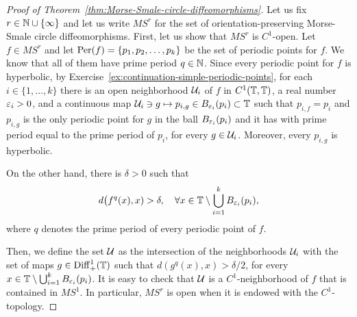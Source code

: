 \begin{proof}[Proof of Theorem~\ref{thm:Morse-Smale-circle-diffeomorphisms}]
  Let us fix $r\in\mathbb{N}\cup\{\infty\}$ and let us write $MS^r$ for the set of orientation-preserving Morse-Smale circle diffeomorphisms. First, let us show that $MS^r$ is $C^1$-open. Let $f\in MS^r$ and let $\operatorname{Per}(f)=\{p_1,p_2,\ldots,p_k\}$ be the set of periodic points for $f$. We know that all of them have prime period $q\in\mathbb{N}$. Since every periodic point for $f$ is hyperbolic, by Exercise~\ref{ex:continuation-simple-periodic-points}, for each $i\in\{1,\ldots,k\}$ there is an open neighborhood $\mathcal{U}_i$ of $f$ in $C^1(\mathbb{T},\mathbb{T})$, a real number $\varepsilon_i>0$, and a continuous map $\mathcal{U}_i\ni g\mapsto p_{i,g}\in B_{\varepsilon_i}(p_i)\subset\mathbb{T}$ such that $p_{i,f}=p_i$ and $p_{i,g}$ is the only periodic point for $g$ in the ball $B_{\varepsilon_i}(p_i)$ and it has with prime period equal to the prime period of $p_i$, for every $g\in\mathcal{U}_i$. Moreover, every $p_{i,g}$ is hyperbolic.

  On the other hand, there is $\delta>0$ such that
  \begin{displaymath}
    d\big(f^q(x),x)>\delta, \quad\forall x\in\mathbb{T}\setminus\bigcup_{i=1}^k B_{\varepsilon_i}(p_i),
  \end{displaymath}
  where $q$ denotes the prime period of every periodic point of $f$.

  Then, we define the set $\mathcal{U}$ as the intersection of the neighborhoods $\mathcal{U}_i$ with the set of maps $g\in\mathrm{Diff}_{+}^{1}(\mathbb{T})$ such that $d(g^q(x),x)>\delta/2$, for every $x\in\mathbb{T}\setminus\bigcup_{i=1}^k B_{\varepsilon_i}(p_i)$. It is easy to check that $\mathcal{U}$ is a $C^1$-neighborhood of $f$ that is contained in $MS^1$. In particular, $MS^r$ is open when it is endowed with the $C^1$-topology.


\end{proof}
